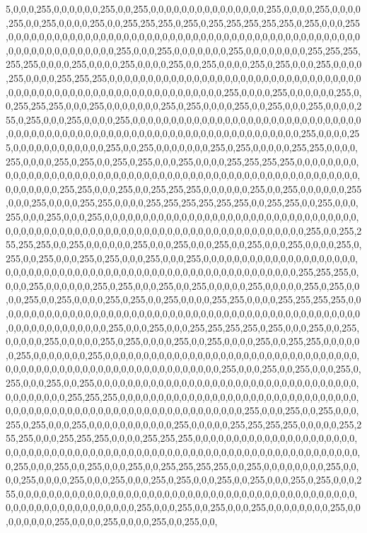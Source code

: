 5,0,0,0,255,0,0,0,0,0,0,255,0,0,255,0,0,0,0,0,0,0,0,0,0,0,0,0,0,0,255,0,0,0,0,255,0,0,0,0,255,0,0,255,0,0,0,0,255,0,0,255,255,255,0,255,0,255,255,255,255,255,0,255,0,0,0,255,0,0,0,0,0,0,0,0,0,0,0,0,0,0,0,0,0,0,0,0,0,0,0,0,0,0,0,0,0,0,0,0,0,0,0,0,0,0,0,0,0,0,0,0,0,0,0,0,0,0,0,0,0,0,0,0,0,0,0,0,255,0,0,0,255,0,0,0,0,0,0,0,255,0,0,0,0,0,0,0,0,255,255,255,255,255,0,0,0,0,255,0,0,0,0,255,0,0,0,0,255,0,0,255,0,0,0,0,255,0,255,0,0,0,255,0,0,0,0,255,0,0,0,0,255,255,255,0,0,0,0,0,0,0,0,0,0,0,0,0,0,0,0,0,0,0,0,0,0,0,0,0,0,0,0,0,0,0,0,0,0,0,0,0,0,0,0,0,0,0,0,0,0,0,0,0,0,0,0,0,0,0,0,0,0,0,0,0,255,0,0,0,0,255,0,0,0,0,0,0,255,0,0,255,255,255,0,0,0,255,0,0,0,0,0,0,0,255,0,255,0,0,0,0,255,0,0,255,0,0,0,255,0,0,0,0,255,0,255,0,0,0,255,0,0,0,0,255,0,0,0,0,0,0,0,0,0,0,0,0,0,0,0,0,0,0,0,0,0,0,0,0,0,0,0,0,0,0,0,0,0,0,0,0,0,0,0,0,0,0,0,0,0,0,0,0,0,0,0,0,0,0,0,0,0,0,0,0,0,0,0,0,0,0,0,0,255,0,0,0,0,255,0,0,0,0,0,0,0,0,0,0,0,0,255,0,0,255,0,0,0,0,0,0,0,255,0,255,0,0,0,0,0,255,255,0,0,0,0,255,0,0,0,0,255,0,255,0,0,255,0,255,0,0,0,255,0,0,0,0,255,255,255,255,0,0,0,0,0,0,0,0,0,0,0,0,0,0,0,0,0,0,0,0,0,0,0,0,0,0,0,0,0,0,0,0,0,0,0,0,0,0,0,0,0,0,0,0,0,0,0,0,0,0,0,0,0,0,0,0,0,0,0,0,0,255,255,0,0,0,255,0,0,255,255,255,0,0,0,0,0,0,255,0,0,255,0,0,0,0,0,0,255,0,0,0,255,0,0,0,0,255,255,0,0,0,0,255,255,255,255,255,255,0,0,255,255,0,0,255,0,0,0,255,0,0,0,255,0,0,0,255,0,0,0,0,0,0,0,0,0,0,0,0,0,0,0,0,0,0,0,0,0,0,0,0,0,0,0,0,0,0,0,0,0,0,0,0,0,0,0,0,0,0,0,0,0,0,0,0,0,0,0,0,0,0,0,0,0,0,0,0,0,0,0,0,0,0,0,0,0,0,0,0,255,0,0,255,255,255,255,0,0,255,0,0,0,0,0,0,255,0,0,0,255,0,0,0,255,0,0,255,0,0,0,255,0,0,0,0,255,0,255,0,0,255,0,0,0,255,0,255,0,0,0,255,0,0,0,255,0,0,0,0,0,0,0,0,0,0,0,0,0,0,0,0,0,0,0,0,0,0,0,0,0,0,0,0,0,0,0,0,0,0,0,0,0,0,0,0,0,0,0,0,0,0,0,0,0,0,0,0,0,0,0,0,0,0,255,255,255,0,0,0,0,255,0,0,0,0,0,0,255,0,255,0,0,0,255,0,0,255,0,0,0,0,0,255,0,0,0,0,0,255,0,255,0,0,0,0,255,0,0,255,0,0,0,0,255,0,255,0,0,255,0,0,0,0,255,255,0,0,0,0,255,255,255,255,0,0,0,0,0,0,0,0,0,0,0,0,0,0,0,0,0,0,0,0,0,0,0,0,0,0,0,0,0,0,0,0,0,0,0,0,0,0,0,0,0,0,0,0,0,0,0,0,0,0,0,0,0,0,0,0,0,0,0,0,0,255,0,0,0,255,0,0,0,255,255,255,255,0,255,0,0,0,255,0,0,255,0,0,0,0,0,255,0,0,0,0,0,255,0,255,0,0,0,0,255,0,0,255,0,0,0,0,255,0,0,255,255,0,0,0,0,0,0,255,0,0,0,0,0,0,0,255,0,0,0,0,0,0,0,0,0,0,0,0,0,0,0,0,0,0,0,0,0,0,0,0,0,0,0,0,0,0,0,0,0,0,0,0,0,0,0,0,0,0,0,0,0,0,0,0,0,0,0,0,0,0,0,0,0,0,0,0,0,255,0,0,0,255,0,0,255,0,0,0,255,0,255,0,0,0,255,0,0,255,0,0,0,0,0,0,0,0,0,0,0,0,0,0,0,0,0,0,0,0,0,0,0,0,0,0,0,0,0,0,0,0,0,0,0,0,0,0,0,0,0,0,255,255,255,0,0,0,0,0,0,0,0,0,0,0,0,0,0,0,0,0,0,0,0,0,0,0,0,0,0,0,0,0,0,0,0,0,0,0,0,0,0,0,0,0,0,0,0,0,0,0,0,0,0,0,0,0,0,0,0,0,0,0,0,0,0,255,0,0,0,255,0,0,255,0,0,0,255,0,255,0,0,0,255,0,0,0,0,0,0,0,0,0,0,0,255,0,0,0,0,0,255,255,255,255,0,0,0,0,0,255,255,255,0,0,0,255,255,255,0,0,0,0,255,255,255,0,0,0,0,0,0,0,0,0,0,0,0,0,0,0,0,0,0,0,0,0,0,0,0,0,0,0,0,0,0,0,0,0,0,0,0,0,0,0,0,0,0,0,0,0,0,0,0,0,0,0,0,0,0,0,0,0,0,0,0,0,0,0,0,0,0,0,0,255,0,0,0,255,0,0,255,0,0,0,255,0,0,255,255,255,255,0,0,255,0,0,0,0,0,0,0,0,255,0,0,0,0,255,0,0,0,0,255,0,0,0,255,0,0,0,255,0,255,0,0,0,255,0,0,255,0,0,0,255,0,255,0,0,0,255,0,0,0,0,0,0,0,0,0,0,0,0,0,0,0,0,0,0,0,0,0,0,0,0,0,0,0,0,0,0,0,0,0,0,0,0,0,0,0,0,0,0,0,0,0,0,0,0,0,0,0,0,0,0,0,0,0,0,0,0,0,255,0,0,0,255,0,0,255,0,0,0,255,0,0,0,0,0,0,0,0,255,0,0,0,0,0,0,0,0,255,0,0,0,0,255,0,0,0,0,255,0,0,255,0,0,